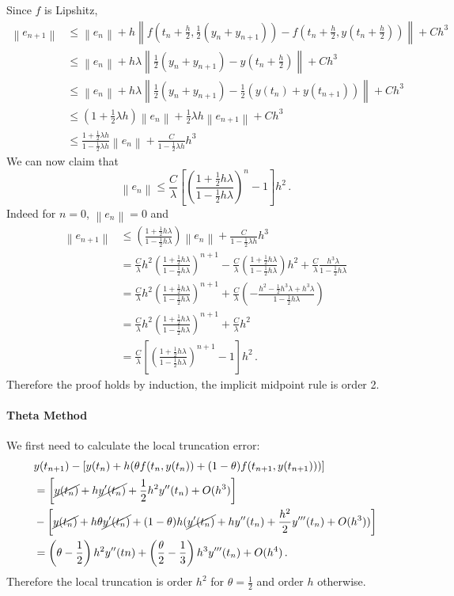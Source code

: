 \documentclass[10pt,letterpaper]{article}
\providecommand{\norm}[1]{\left\lVert#1\right\rVert}
\begin{document}
Since $f$ is Lipshitz,
\begin{align*}
\norm{e_{n+1}}&\leq\norm{e_n}+h\norm{f\left(t_n+\frac{h}{2},\frac{1}{2}(y_n+y_{n+1})\right)-f\left(t_n+\frac{h}{2},y(t_n+\frac{h}{2})\right)}+Ch^3\\
&\leq\norm{e_n}+h\lambda\norm{\frac{1}{2}(y_n+y_{n+1})-y\left(t_n+\frac{h}{2}\right)}+Ch^3\\
&\leq\norm{e_n}+h\lambda\norm{\frac{1}{2}(y_n+y_{n+1})-\frac{1}{2}\left(y(t_n)+y(t_{n+1})\right)}+Ch^3\\
&\leq(1+\frac{1}{2}\lambda h)\norm{e_n}+\frac{1}{2}\lambda h\norm{e_{n+1}}+Ch^3\\
&\leq\frac{1+\frac{1}{2}\lambda h}{1-\frac{1}{2}\lambda h}\norm{e_n}+\frac{C}{1-\frac{1}{2}\lambda h}h^3
\end{align*}
We can now claim that 
\[
\norm{e_n}\leq\frac{C}{\lambda}\left[\left(\frac{1+\frac{1}{2}h\lambda}{1-\frac{1}{2}h\lambda}\right)^n-1\right]h^2\,.
\]
Indeed for $n=0$, $\norm{e_n}=0$ and 
\begin{align*}
\norm{e_{n+1}}&\leq\left(\frac{1+\frac{1}{2}h\lambda}{1-\frac{1}{2}h\lambda}\right)\norm{e_n}+\frac{C}{1-\frac{1}{2}\lambda h}h^3\\
&=\frac{C}{\lambda}h^2\left(\frac{1+\frac{1}{2}h\lambda}{1-\frac{1}{2}h\lambda}\right)^{n+1}
-\frac{C}{\lambda}\left(\frac{1+\frac{1}{2}h\lambda}{1-\frac{1}{2}h\lambda}\right)h^2+\frac{C}{\lambda}\frac{h^3\lambda}{1-\frac{1}{2}h\lambda}\\
&=\frac{C}{\lambda}h^2\left(\frac{1+\frac{1}{2}h\lambda}{1-\frac{1}{2}h\lambda}\right)^{n+1}
+\frac{C}{\lambda}\left(-\frac{h^2-\frac{1}{2}h^3\lambda+h^3\lambda}{1-\frac{1}{2}h\lambda}\right)\\
&=\frac{C}{\lambda}h^2\left(\frac{1+\frac{1}{2}h\lambda}{1-\frac{1}{2}h\lambda}\right)^{n+1}
+\frac{C}{\lambda}h^2\\
&=\frac{C}{\lambda}\left[\left(\frac{1+\frac{1}{2}h\lambda}{1-\frac{1}{2}h\lambda}\right)^{n+1}-1\right]h^2\,.
\end{align*}
Therefore the proof holds by induction, the implicit midpoint rule is order 2.

\paragraph*{Theta Method} We first need to calculate the local truncation error:
\begin{align*}
&y(t_{n+1})-\left[y(t_n)+h(\theta f(t_n,y(t_n))+(1-\theta)f(t_{n+1},y(t_{n+1})))\right]\\
&=\left[\cancel{y(t_n)}+h\cancel{y'(t_n)}+\frac{1}{2}h^2y''(t_n)+O(h^3)\right]\\
&-\left[\cancel{y(t_n)}+h\theta\cancel{y'(t_n)}+(1-\theta)h(\cancel{y'(t_n)}+hy''(t_n)+\frac{h^2}{2}y'''(t_n)+O(h^3))\right]\\
&=\left(\theta-\frac{1}{2}\right)h^2y''(tn)+\left(\frac{\theta}{2}-\frac{1}{3}\right)h^3y'''(t_n)+O(h^4)\,.
\end{align*}
Therefore the local truncation is order $h^2$ for $\theta=\frac{1}{2}$ and order $h$ otherwise.
\end{document}
